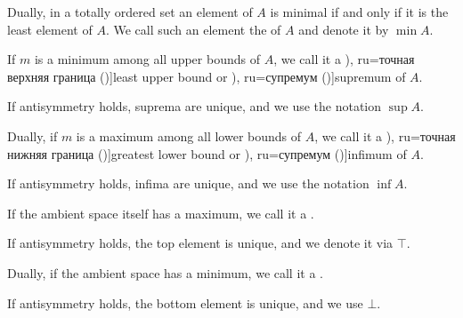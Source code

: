 \begin{definition}
\begin{thmenum}
\begin{paracol}{2}
      \begin{rightcolumn}
        Dually, in a totally ordered set an element of \( A \) is minimal if and only if it is the least element of \( A \). We call such an element the  of \( A \) and denote it by \( \min A \).
      \end{rightcolumn}
    \end{paracol}

    \begin{paracol}{2}
      \begin{leftcolumn}
        If \( m \) is a minimum among all upper bounds of \( A \), we call it a \term[bg=точна горна граница (\cite[19]{Тагамлицки1971Диф}), ru=точная верхняя граница (\cite[\S 5.12]{Ляпин1960Полугруппы})]{least upper bound} or \term[bg=супремум (\cite[10]{Проданов1982ФункАнализТом1}), ru=супремум (\cite[\S 5.12]{Ляпин1960Полугруппы})]{supremum} of \( A \).

        If antisymmetry holds, suprema are unique, and we use the notation \( \sup A \).
      \end{leftcolumn}

      \begin{rightcolumn}
        Dually, if \( m \) is a maximum among all lower bounds of \( A \), we call it a \term[bg=точна долна граница (\cite[19]{Тагамлицки1971Диф}), ru=точная нижняя граница (\cite[\S 5.12]{Ляпин1960Полугруппы})]{greatest lower bound} or \term[bg=инфимум (\cite[10]{Проданов1982ФункАнализТом1}), ru=супремум (\cite[\S 5.12]{Ляпин1960Полугруппы})]{infimum} of \( A \).

        If antisymmetry holds, infima are unique, and we use the notation \( \inf A \).
      \end{rightcolumn}
    \end{paracol}

    \begin{paracol}{2}
      \begin{leftcolumn}
        If the ambient space itself has a maximum, we call it a .

        If antisymmetry holds, the top element is unique, and we denote it via \( \top \).
      \end{leftcolumn}

      \begin{rightcolumn}
        Dually, if the ambient space has a minimum, we call it a .

        If antisymmetry holds, the bottom element is unique, and we use \( \bot \).
      \end{rightcolumn}
    \end{paracol}
  \end{thmenum}
\end{definition}

